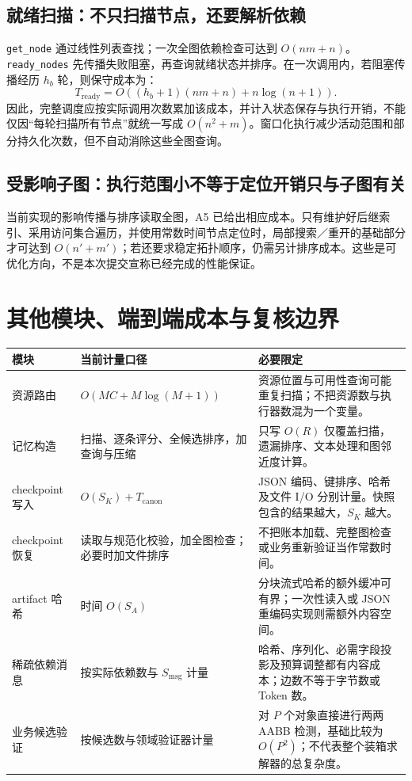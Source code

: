 \documentclass[UTF8,a4paper,11pt]{ctexart}
\begin{document}
\subsection{就绪扫描：不只扫描节点，还要解析依赖}
\texttt{get\_node} 通过线性列表查找；一次全图依赖检查可达到 $O(nm+n)$。\texttt{ready\_nodes} 先传播失败阻塞，再查询就绪状态并排序。在一次调用内，若阻塞传播经历 $h_b$ 轮，则保守成本为：
\[
T_{\mathrm{ready}}
=O\!\left((h_b+1)(nm+n)+n\log(n+1)\right).
\]
因此，完整调度应按实际调用次数累加该成本，并计入状态保存与执行开销，不能仅因“每轮扫描所有节点”就统一写成 $O(n^2+m)$。窗口化执行减少活动范围和部分持久化次数，但不自动消除这些全图查询。

\subsection{受影响子图：执行范围小不等于定位开销只与子图有关}
当前实现的影响传播与排序读取全图，A5 已给出相应成本。只有维护好后继索引、采用访问集合遍历，并使用常数时间节点定位时，局部搜索／重开的基础部分才可达到 $O(n'+m')$；若还要求稳定拓扑顺序，仍需另计排序成本。这些是可优化方向，不是本次提交宣称已经完成的性能保证。

\clearpage
\section{其他模块、端到端成本与复核边界}
\begin{center}
\small
\renewcommand{\arraystretch}{1.18}
\begin{tabularx}{\textwidth}{@{}p{}p{}X@{}}
\toprule
模块 & 当前计量口径 & 必要限定\\
\midrule
资源路由 & $O(MC+M\log(M+1))$ & 资源位置与可用性查询可能重复扫描；不把资源数与执行器数混为一个变量。\\
记忆构造 & 扫描、逐条评分、全候选排序，加查询与压缩 & 只写 $O(R)$ 仅覆盖扫描，遗漏排序、文本处理和图邻近度计算。\\
checkpoint 写入 & $O(S_K)+T_{\mathrm{canon}}$ & JSON 编码、键排序、哈希及文件 I/O 分别计量。快照包含的结果越大，$S_K$ 越大。\\
checkpoint 恢复 & 读取与规范化校验，加全图检查；必要时加文件排序 & 不把账本加载、完整图检查或业务重新验证当作常数时间。\\
artifact 哈希 & 时间 $O(S_A)$ & 分块流式哈希的额外缓冲可有界；一次性读入或 JSON 重编码实现则需额外内容空间。\\
稀疏依赖消息 & 按实际依赖数与 $S_{\mathrm{msg}}$ 计量 & 哈希、序列化、必需字段投影及预算调整都有内容成本；边数不等于字节数或 Token 数。\\
业务候选验证 & 按候选数与领域验证器计量 & 对 $P$ 个对象直接进行两两 AABB 检测，基础比较为 $O(P^2)$；不代表整个装箱求解器的总复杂度。\\
\bottomrule
\end{tabularx}
\end{center}
\end{document}
